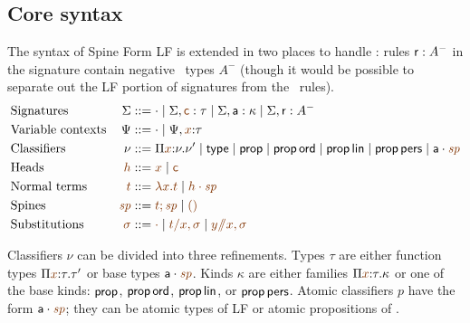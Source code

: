 \subsection{Core syntax}

The syntax of Spine Form LF is extended in two places to handle \sls:
rules ${\sf r} : A^-$ in the signature contain negative \sls~types
$A^-$ (though it would be possible to separate out the LF portion of
signatures from the \sls~rules). %
\begin{align*}
& \mbox{Signatures} & \Sigma & ::= \cdot 
  \mid \Sigma, \lf{\sf c} : \tau
  \mid \Sigma, {\sf a} : \kappa
  \mid \Sigma, {\sf r} : A^-
\\
& \mbox{Variable contexts} & \Psi & ::= \cdot
  \mid \Psi, \lf{x} {:} \tau 
\\
& \mbox{Classifiers} & \nu & ::= \lfpi{x}{\nu}{\nu'} \mid {\sf type}
  \mid {\sf prop}
  \mid {\sf prop}\,{\sf ord}
  \mid {\sf prop}\,{\sf lin}
  \mid {\sf prop}\,{\sf pers}
  \mid \lfroot{\sf a}{\spi}
\\
& \mbox{Heads} & \lf{h} & ::= \lf{x} \mid \lf{\sf c}
\\
& \mbox{Normal terms} & \lf{t} & ::= \lf{\lambda x.t}
  \mid \lf{\lfroot{h}{\spi}}
\\
& \mbox{Spines} & \lf{\spi} & ::= \lf{t; \spi} \mid \lf{\lfnil}
\\
& \mbox{Substitutions} & \lf{\sigma} & ::= \lf{\cdot}
  \mid \lf{t/x, \sigma}
  \mid \lf{y/\!\!/x, \sigma}
\end{align*}

\noindent
Classifiers $\nu$ can be divided into three refinements.  Types $\tau$
are either function types $\lfpi{x}{\tau}{\tau'}$ or base types
$\lfroot{\sf a}{\spi}$.  Kinds $\kappa$ are either families
$\lfpi{x}{\tau}{\kappa}$ or one of the base kinds: ${\sf prop}$, ${\sf
  prop}\,{\sf ord}$, ${\sf prop}\,{\sf lin}$, or ${\sf prop}\,{\sf
  pers}$. Atomic classifiers $p$ have the form $\lfroot{\sf a}{\spi}$;
they can be atomic types of LF or atomic propositions of \sls.

